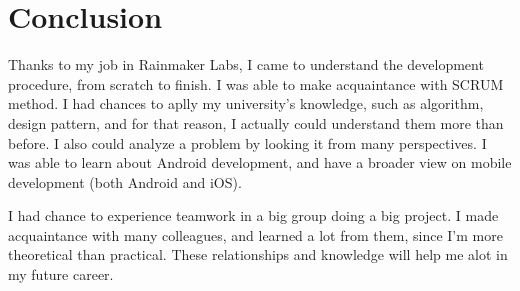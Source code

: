 \chapter{Conclusion}

Thanks to my job in Rainmaker Labs, I came to understand the development procedure, from scratch to finish. I was able to make acquaintance with SCRUM method. I had chances to aplly my university's knowledge, such as algorithm, design pattern, and for that reason, I actually could understand them more than before. I also could analyze a problem by looking it from many perspectives. I was able to learn about Android development, and have a broader view on mobile development (both Android and iOS).

I had chance to experience teamwork in a big group doing a big project. I made acquaintance with many colleagues, and learned a lot from them, since I'm more theoretical than practical. These relationships and knowledge will help me alot in my future career. 